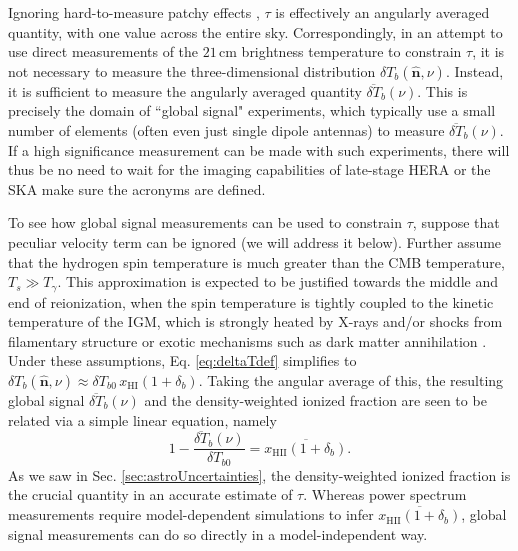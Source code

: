 \documentclass[twocolumn,aps,prd,nofootinbib,showpacs]{revtex4-1}
\begin{document}
Ignoring hard-to-measure patchy effects \cite{dvorkin_et_al2009,su_et_al2011}, $\tau$ is effectively an angularly averaged quantity, with one value across the entire sky. Correspondingly, in an attempt to use direct measurements of the $21\,\textrm{cm}$ brightness temperature to constrain $\tau$, it is not necessary to measure the three-dimensional distribution $\delta T_b (\mathbf{\hat{n}}, \nu)$. Instead, it is sufficient to measure the angularly averaged quantity $\overline{\delta T}_b (\nu)$. This is precisely the domain of ``global signal" experiments, which typically use a small number of elements (often even just single dipole antennas) to measure $\overline{\delta T}_b (\nu)$. If a high significance measurement can be made with such experiments, there will thus be no need to wait for the imaging capabilities of late-stage HERA or the SKA \acl{make sure the acronyms are defined}.

To see how global signal measurements can be used to constrain $\tau$, suppose that peculiar velocity term can be ignored (we will address it below). Further assume that the hydrogen spin temperature is much greater than the CMB temperature, $T_s \gg T_\gamma$. This approximation is expected to be justified towards the middle and end of reionization, when the spin temperature is tightly coupled to the kinetic temperature of the IGM, which is strongly heated by X-rays and/or shocks from filamentary structure or exotic mechanisms such as dark matter annihilation \cite{gnedin_and_shaver2004,pritchard_et_al2010,mirabel_et_al2011,valdes_et_al2013,evoli_et_al2014}. Under these assumptions, Eq. \eqref{eq:deltaTdef} simplifies to $\delta T_b(\mathbf{\hat{n}}, \nu) \approx \delta T_{b0}\, x_\textrm{HI}  (1 + \delta_b)$. Taking the angular average of this, the resulting global signal $\overline{\delta T}_b (\nu)$ and the density-weighted ionized fraction are seen to be related via a simple linear equation, namely
\begin{equation}
\label{eq:globalSigDirect}
1- \frac{\overline{\delta T}_b (\nu)}{\delta T_{b0}} = \overline{x_\textrm{HII} (1+\delta_b)}.
\end{equation}
As we saw in Sec. \ref{sec:astroUncertainties}, the density-weighted ionized fraction is the crucial quantity in an accurate estimate of $\tau$. Whereas power spectrum measurements require model-dependent simulations to infer $\overline{x_\textrm{HII} (1+\delta_b)}$, global signal measurements can do so directly in a model-independent way.
\end{document}
